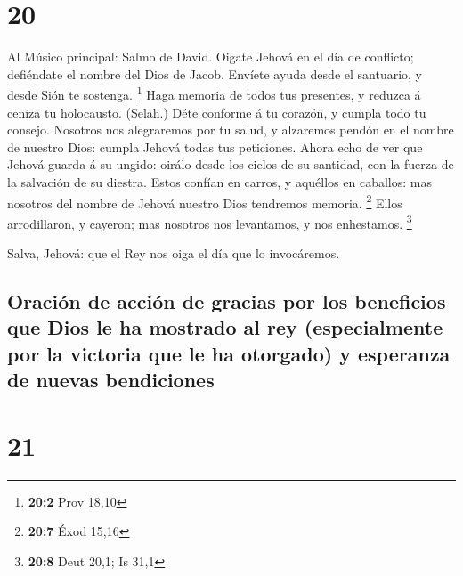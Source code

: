 \hypertarget{section-19}{%
\section{20}\label{section-19}}

 Al Músico principal: Salmo de David. Oigate Jehová en el
día de conflicto; defiéndate el nombre del Dios de Jacob. 
Envíete ayuda desde el santuario, y desde Sión te sostenga. \footnote{\textbf{20:2}
  Prov 18,10}  Haga memoria de todos tus presentes, y
reduzca á ceniza tu holocausto. (Selah.)  Déte conforme á tu
corazón, y cumpla todo tu consejo.  Nosotros nos alegraremos
por tu salud, y alzaremos pendón en el nombre de nuestro Dios: cumpla
Jehová todas tus peticiones.  Ahora echo de ver que Jehová
guarda á su ungido: oirálo desde los cielos de su santidad, con la
fuerza de la salvación de su diestra.  Estos confían en
carros, y aquéllos en caballos: mas nosotros del nombre de Jehová
nuestro Dios tendremos memoria. \footnote{\textbf{20:7} Éxod 15,16}
 Ellos arrodillaron, y cayeron; mas nosotros nos levantamos,
y nos enhestamos. \footnote{\textbf{20:8} Deut 20,1; Is 31,1}

 Salva, Jehová: que el Rey nos oiga el día que lo
invocáremos.

\hypertarget{oraciuxf3n-de-acciuxf3n-de-gracias-por-los-beneficios-que-dios-le-ha-mostrado-al-rey-especialmente-por-la-victoria-que-le-ha-otorgado-y-esperanza-de-nuevas-bendiciones}{%
\subsection{Oración de acción de gracias por los beneficios que Dios le
ha mostrado al rey (especialmente por la victoria que le ha otorgado) y
esperanza de nuevas
bendiciones}\label{oraciuxf3n-de-acciuxf3n-de-gracias-por-los-beneficios-que-dios-le-ha-mostrado-al-rey-especialmente-por-la-victoria-que-le-ha-otorgado-y-esperanza-de-nuevas-bendiciones}}

\hypertarget{section-20}{%
\section{21}\label{section-20}}

